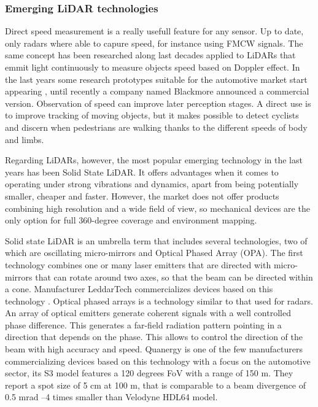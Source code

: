 \subsubsection{Emerging LiDAR technologies}

Direct speed measurement is a really usefull feature for any sensor. Up to date,
only radars where able to capure speed, for instance using FMCW signals.
The same concept has been researched along last decades \cite{Nordin2004}
applied to LiDARs that emmit light continuously to measure objects speed based 
on Doppler effect. In the last years some research prototypes suitable for
the automotive market start appearing \cite{Poulton2016}, until recently
a company named Blackmore announced a commercial version. 
Observation of speed can improve later perception stages. A direct use is to
improve tracking of moving objects, but it makes possible to detect cyclists 
and discern when pedestrians are walking thanks to the different speeds of
body and limbs.

Regarding LiDARs, however, the most popular emerging technology in the last 
years has been Solid State LiDAR. It offers advantages when it comes
to operating under strong vibrations and dynamics, apart from being potentially
smaller, cheaper and faster. 
However, the market does not offer products combining high resolution and a 
wide field of view, so mechanical devices are the only option for full 
360-degree coverage and environment mapping.

Solid state LiDAR is an umbrella term that includes several technologies, two 
of which are oscillating micro-mirrors and Optical Phased Array (OPA).
The first technology combines one or many laser emitters that are directed
with micro-mirrors that can rotate around two axes, so that the beam 
can be directed within a cone. Manufacturer LeddarTech commercializes devices
based on this technology \cite{LeddarTech2016}.
Optical phased arrays \cite{McManamon1996} is a technology similar to that used 
for radars. An array of optical emitters generate coherent signals with a well
controlled phase difference. This generates a far-field radiation pattern 
pointing in a direction that depends on the phase. This allows to control the 
direction of the beam with high accuracy and speed. Quanergy \cite{Eldada2017} 
is one of the few manufacturers commercializing devices based on this technology
with a focus on the automotive sector, its S3 model features a 120 degrees FoV
with a range of 150 m. They report a spot size of 5 cm at 100 m, that is 
comparable to a beam divergence of 0.5 mrad --4 times smaller than Velodyne 
HDL64 model.

